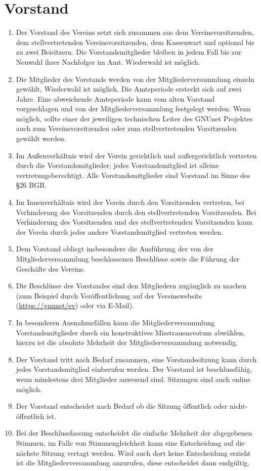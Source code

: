 \documentclass[german,a4paper]{article} %
\newenvironment{enumpar}{%
  \renewcommand{\labelenumi}{\theenumi}%
  \renewcommand{\theenumi}{(\arabic{enumi})}%
  \renewcommand{\labelenumii}{\theenumii}%
  \renewcommand{\theenumii}{(\alph{enumii})}%
  \begin{enumerate}}
{\end{enumerate}}
\begin{document}
\section{Vorstand}
\label{Vorstand}
\begin{enumpar}
\item \label{vorstandsämter} Der Vorstand des Vereins setzt sich zusammen aus dem Vereinsvorsitzenden, dem stellvertretenden Vereinsvorsitzenden, dem Kassenwart und optional bis zu zwei Beisitzern. Die Vorstandsmitglieder bleiben in jedem Fall bis zur Neuwahl ihrer Nachfolger im Amt. Wiederwahl ist möglich.
\item Die Mitglieder des Vorstands werden von der Mitgliederversammlung einzeln gewählt, Wiederwahl ist möglich. Die Amtsperiode ersteckt sich auf zwei Jahre. Eine abweichende Amtsperiode kann vom alten Vorstand vorgeschlagen und von der Mitgliederversammlung festgelegt werden. Wenn möglich, sollte einer der jeweiligen technischen Leiter des GNUnet Projektes auch zum Vereinsvorsitzenden oder zum stellvertretenden Vorsitzenden gewählt werden.
\item Im Außenverhältnis wird der Verein gerichtlich und außergerichtlich vertreten durch die Vorstandsmitglieder; jedes Vorstandsmitglied ist alleine vertretungsberechtigt. Alle Vorstandsmitglieder sind Vorstand im Sinne des \S26 BGB.\par
\item Im Innenverhältnis wird der Verein durch den Vorsitzenden vertreten, bei Verhinderung des Vorsitzenden durch den stellvertretenden Vorsitzenden. Bei Verhinderung des Vorsitzenden und des stellvertretenden Vorsitzenden kann der Verein durch jedes andere Vorstandsmitglied vertreten werden.
\item Dem Vorstand obliegt insbesondere die Ausführung der von der Mitgliederversammlung beschlossenen Beschlüsse sowie die Führung der Geschäfte des Vereins.
\item Die Beschlüsse des Vorstandes sind den Mitgliedern zugänglich zu machen (zum Beispiel durch Ver\"offentlichung auf der Vereinswebsite (\url{https://gnunet/ev}) oder via E-Mail).
\item In besonderen Ausnahmefällen kann die Mitgliederversammlung Vorstandsmitglieder durch ein konstruktives Misstrauensvotum abwählen, hierzu ist die absolute Mehrheit der Mitgliederversammlung notwendig.
\item Der Vorstand tritt nach Bedarf zusammen, eine Vorstandssitzung kann durch jedes Vorstandsmitglied einberufen werden. Der Vorstand ist beschlussfähig, wenn mindestens drei Mitglieder anwesend sind. Sitzungen sind auch online m\"oglich.
\item Der Vorstand entscheidet nach Bedarf ob die Sitzung \"offentlich oder nicht-\"offentlich ist.
\item Bei der Beschlussfassung entscheidet die einfache Mehrheit der abgegebenen Stimmen, im Falle von Stimmengleichheit kann eine Entscheidung auf die nächste Sitzung vertagt werden. Wird auch dort keine Entscheidung erzieht ist die Mitgliederversammlung anzurufen, diese entscheidet dann endgültig.
\end{enumpar}
\end{document}
